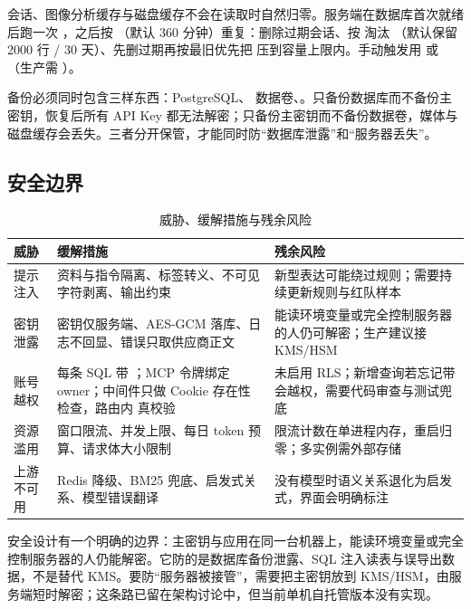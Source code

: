 会话、图像分析缓存与磁盘缓存不会在读取时自然归零。服务端在数据库首次就绪后跑一次 ，之后按 （默认 360 分钟）重复：删除过期会话、按  淘汰 （默认保留 2000 行 / 30 天）、先删过期再按最旧优先把  压到容量上限内。手动触发用  或 （生产需 ）。

备份必须同时包含三样东西：PostgreSQL、 数据卷、。只备份数据库而不备份主密钥，恢复后所有 API Key 都无法解密；只备份主密钥而不备份数据卷，媒体与磁盘缓存会丢失。三者分开保管，才能同时防“数据库泄露”和“服务器丢失”。

\subsection{安全边界}

\begin{table}[htbp]
  \centering
  \small
  \caption{威胁、缓解措施与残余风险}
  \label{tab:threats}
  \begin{tabularx}{\textwidth}{L{3.0cm}L{6.6cm}Y}
    \toprule
\textbf{威胁} & \textbf{缓解措施} & \textbf{残余风险} \\
    \midrule
    提示注入 & 资料与指令隔离、标签转义、不可见字符剥离、输出约束 & 新型表达可能绕过规则；需要持续更新规则与红队样本 \\
    密钥泄露 & 密钥仅服务端、AES-GCM 落库、日志不回显、错误只取供应商正文 & 能读环境变量或完全控制服务器的人仍可解密；生产建议接 KMS/HSM \\
    账号越权 & 每条 SQL 带 ；MCP 令牌绑定 owner；中间件只做 Cookie 存在性检查，路由内  真校验 & 未启用 RLS；新增查询若忘记带  会越权，需要代码审查与测试兜底 \\
    资源滥用 & 窗口限流、并发上限、每日 token 预算、请求体大小限制 & 限流计数在单进程内存，重启归零；多实例需外部存储 \\
    上游不可用 & Redis 降级、BM25 兜底、启发式关系、模型错误翻译 & 没有模型时语义关系退化为启发式，界面会明确标注 \\
    \bottomrule
  \end{tabularx}
\end{table}

安全设计有一个明确的边界：主密钥与应用在同一台机器上，能读环境变量或完全控制服务器的人仍能解密。它防的是数据库备份泄露、SQL 注入读表与误导出数据，不是替代 KMS。要防“服务器被接管”，需要把主密钥放到 KMS/HSM，由服务端短时解密；这条路已留在架构讨论中，但当前单机自托管版本没有实现。
